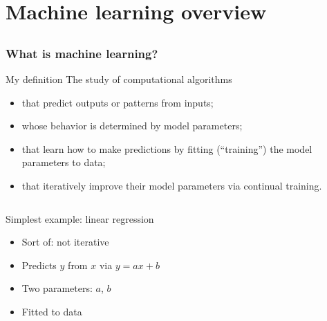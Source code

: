 \section[ML overview]{Machine learning overview}

\subsection{}

\begin{frame}
    \frametitle{What is machine learning?}

    \begin{block}{My definition}
        The study of computational algorithms
        \begin{itemize}
            \item that \alert{predict} outputs or patterns from inputs;
            \item whose behavior is determined by \alert{model parameters};
            \item that \alert{learn} how to make predictions by fitting (``training'') the model parameters to data;
            \item that \alert{iteratively} improve their model parameters via continual training.
        \end{itemize}
    \end{block}
    \pause

    \begin{columns}
        \begin{column}{2.5in}
            Simplest example: linear regression
            \begin{itemize}
                \item Sort of: not iterative
                \item Predicts $y$ from $x$ via $y = ax + b$
                \item Two parameters: $a$, $b$
                \item Fitted to data
            \end{itemize}
        \end{column}
        \begin{column}{1.75in}
        \end{column}
    \end{columns}
\end{frame}

